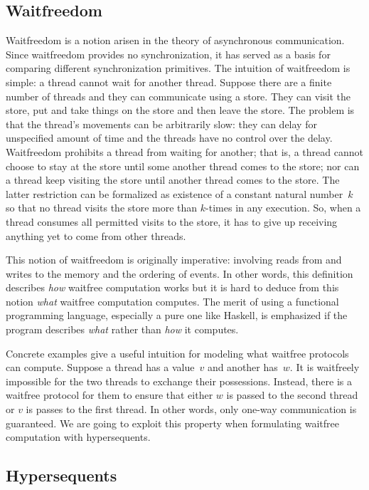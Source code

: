 \documentclass[doctor]{iscs-thesis}
\begin{document}
\subsection{Waitfreedom}
\label{wf}

Waitfreedom is a notion arisen in the theory of asynchronous
communication. Since waitfreedom provides no synchronization, it has
served as a basis for comparing different synchronization primitives.
The intuition of waitfreedom is simple: a thread cannot
wait for another thread.  Suppose there are a finite number of threads and they can
communicate using a store. They can
visit the store, put and take things on the store and then leave the
store. The problem is that the thread's movements can be arbitrarily
slow: they can delay for unspecified amount of time and the threads
have no control over the delay. Waitfreedom prohibits a thread from
waiting for another; that is, a thread cannot choose to stay at the
store until some another thread comes to the store; nor can a thread
keep visiting the store until another thread comes to the store.  The
latter restriction can be formalized as existence of a constant natural
number~$k$ so
that no thread visits the store more than
$k$-times in any execution.  So, when a thread consumes all permitted
visits to the store, it has to give up receiving anything yet to come
from
other threads.

This notion of waitfreedom is originally imperative: involving reads from and writes to
the memory and the ordering of events.  In other words, this definition
describes \textit{how} waitfree computation works but it is hard to deduce from
this notion \textit{what} waitfree computation computes.
The merit of using a functional programming language, especially a pure
one like Haskell, is emphasized if the program describes \textit{what}
rather than \textit{how} it computes.

Concrete examples give a useful intuition for modeling what waitfree
protocols can compute.
Suppose a thread has a value~$v$ and another has~$w$.
It is waitfreely impossible for the two threads to exchange their
possessions.  Instead, there is a waitfree protocol for them to ensure
that either $w$ is passed to the second thread or $v$ is passes to the
first thread.
In other words, only one-way communication is guaranteed.  We are going
to exploit this property when formulating waitfree computation with hypersequents.


\subsection{Hypersequents}
\end{document}
